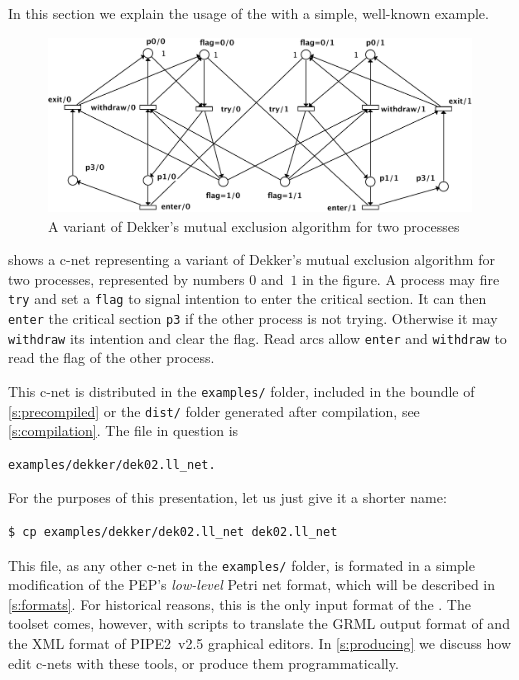\documentclass[a4paper]{refart}
\begin{document}
In this section
we explain the usage of the \cunft{} with a simple, well-known example.

\begin{figure}[h]
\centering
\includegraphics[scale=0.50]{fig/dekker2.pdf}
\caption{A variant of Dekker's mutual exclusion algorithm for two processes}
\label{f:dekker}
\end{figure}

 shows a c-net representing a variant of Dekker's mutual
exclusion algorithm for two processes, represented by numbers $0$ and~$1$
in the figure.
A process may fire \verb!try! and set a
\verb!flag! to signal intention to enter the critical section. 
It can then \verb!enter! the critical section \verb!p3!
if the other process is not trying.
Otherwise it may \verb!withdraw! its intention and clear the flag.  Read arcs
allow \verb!enter! and \verb!withdraw! to read the flag of the other process.

This c-net is distributed in the \verb!examples/! folder, included in the
boundle of \cref{s:precompiled} or the \verb!dist/! folder generated after
compilation, see \cref{s:compilation}.
The file in question is
\begin{verbatim}
examples/dekker/dek02.ll_net.
\end{verbatim}
For the purposes of this presentation, let us just give it a shorter name:
\begin{verbatim}
$ cp examples/dekker/dek02.ll_net dek02.ll_net
\end{verbatim}
This file, as any other c-net in the \verb!examples/! folder, is formated
in a simple modification of the PEP's \emph{low-level} Petri net
format, which will be described in \cref{s:formats}.
For historical reasons, this is the only input format of the \cunft{}.
The toolset comes, however, with
scripts to translate the GRML output format of \coloane\cite{Coloane}
and the XML format of PIPE2~v2.5\cite{BPK07} graphical editors.
In \cref{s:producing} we discuss how edit c-nets with these tools,
or produce them programmatically.
\end{document}
